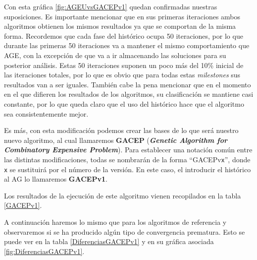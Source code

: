 Con esta gráfica \ref{fig:AGEUvsGACEPv1} quedan confirmadas nuestras suposiciones. 
Es importante mencionar que en sus primeras iteraciones ambos algoritmos obtienen los mismos resultados ya que se comportan de la misma forma. 
Recordemos que cada fase del histórico ocupa 50 iteraciones, por lo que durante las primeras 50 iteraciones va a mantener el mismo comportamiento que AGE, con la excepción de que va a ir almacenando las soluciones para su posterior análisis. 
Estas 50 iteraciones suponen un poco más del 10\% inicial de las iteraciones totales, por lo que es obvio que para todas estas \textit{milestones} sus resultados van a ser iguales. 
También cabe la pena mencionar que en el momento en el que difieren los resultados de los algoritmos, su clasificación se mantiene casi constante, por lo que queda claro que el uso del histórico hace que el algoritmo sea consistentemente mejor.  

Es más, con esta modificación podemos crear las bases de lo que será nuestro nuevo algoritmo, al cual llamaremos \textbf{GACEP} (\textbf{\textit{Genetic Algorithm for Combinatory Expensive Problem}}). 
Para establecer una notación común entre las distintas modificaciones, todas se nombrarán de la forma ``GACEPv\texttt{x}'', donde \texttt{x} se sustituirá por el número de la versión. 
En este caso, el introducir el histórico al AG lo llamaremos \textbf{GACEPv1}.

Los resultados de la ejecución de este algoritmo vienen recopilados en la tabla \ref{GACEPv1}.

A continuación haremos lo mismo que para los algoritmos de referencia y observaremos si se ha producido algún tipo de convergencia prematura. 
Esto se puede ver en la tabla \ref{DiferenciasGACEPv1} y en su gráfica asociada \ref{fig:DiferenciasGACEPv1}.


